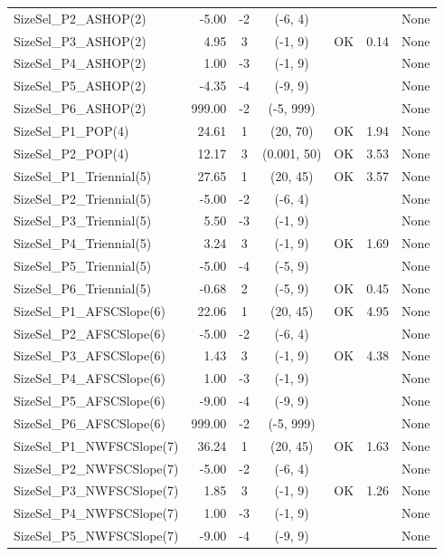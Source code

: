 \documentclass[12pt,]{article}
\begin{document}
\begin{landscape}
\begin{longtable}{lrcccll}
  SizeSel\_P2\_ASHOP(2) & -5.00 & -2 & (-6, 4) &  &  & None \\ 
  SizeSel\_P3\_ASHOP(2) & 4.95 & 3 & (-1, 9) & OK & 0.14 & None \\ 
  SizeSel\_P4\_ASHOP(2) & 1.00 & -3 & (-1, 9) &  &  & None \\ 
  SizeSel\_P5\_ASHOP(2) & -4.35 & -4 & (-9, 9) &  &  & None \\ 
  SizeSel\_P6\_ASHOP(2) & 999.00 & -2 & (-5, 999) &  &  & None \\ 
  SizeSel\_P1\_POP(4) & 24.61 & 1 & (20, 70) & OK & 1.94 & None \\ 
  SizeSel\_P2\_POP(4) & 12.17 & 3 & (0.001, 50) & OK & 3.53 & None \\ 
  SizeSel\_P1\_Triennial(5) & 27.65 & 1 & (20, 45) & OK & 3.57 & None \\ 
  SizeSel\_P2\_Triennial(5) & -5.00 & -2 & (-6, 4) &  &  & None \\ 
  SizeSel\_P3\_Triennial(5) & 5.50 & -3 & (-1, 9) &  &  & None \\ 
  SizeSel\_P4\_Triennial(5) & 3.24 & 3 & (-1, 9) & OK & 1.69 & None \\ 
  SizeSel\_P5\_Triennial(5) & -5.00 & -4 & (-5, 9) &  &  & None \\ 
  SizeSel\_P6\_Triennial(5) & -0.68 & 2 & (-5, 9) & OK & 0.45 & None \\ 
  SizeSel\_P1\_AFSCSlope(6) & 22.06 & 1 & (20, 45) & OK & 4.95 & None \\ 
  SizeSel\_P2\_AFSCSlope(6) & -5.00 & -2 & (-6, 4) &  &  & None \\ 
  SizeSel\_P3\_AFSCSlope(6) & 1.43 & 3 & (-1, 9) & OK & 4.38 & None \\ 
  SizeSel\_P4\_AFSCSlope(6) & 1.00 & -3 & (-1, 9) &  &  & None \\ 
  SizeSel\_P5\_AFSCSlope(6) & -9.00 & -4 & (-9, 9) &  &  & None \\ 
  SizeSel\_P6\_AFSCSlope(6) & 999.00 & -2 & (-5, 999) &  &  & None \\ 
  SizeSel\_P1\_NWFSCSlope(7) & 36.24 & 1 & (20, 45) & OK & 1.63 & None \\ 
  SizeSel\_P2\_NWFSCSlope(7) & -5.00 & -2 & (-6, 4) &  &  & None \\ 
  SizeSel\_P3\_NWFSCSlope(7) & 1.85 & 3 & (-1, 9) & OK & 1.26 & None \\ 
  SizeSel\_P4\_NWFSCSlope(7) & 1.00 & -3 & (-1, 9) &  &  & None \\ 
  SizeSel\_P5\_NWFSCSlope(7) & -9.00 & -4 & (-9, 9) &  &  & None \\ 

\end{longtable}
\end{landscape}
\end{document}
